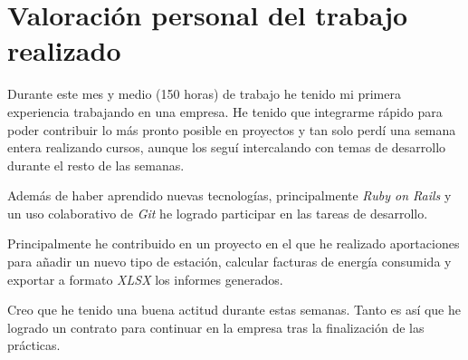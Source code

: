 \chapter{Valoración personal del trabajo realizado}

Durante este mes y medio (150 horas) de trabajo he tenido mi primera experiencia trabajando en una empresa. He tenido que integrarme rápido para poder contribuir lo más pronto posible en proyectos y tan solo perdí una semana entera realizando cursos, aunque los seguí intercalando con temas de desarrollo durante el resto de las semanas.

Además de haber aprendido nuevas tecnologías, principalmente \textit{Ruby on Rails} y un uso colaborativo de \textit{Git} he logrado participar en las tareas de desarrollo.

Principalmente he contribuido en un proyecto en el que he realizado aportaciones para añadir un nuevo tipo de estación, calcular facturas de energía consumida y exportar a formato \textit{XLSX} los informes generados.

Creo que he tenido una buena actitud durante estas semanas. Tanto es así que he logrado un contrato para continuar en la empresa tras la finalización de las prácticas.